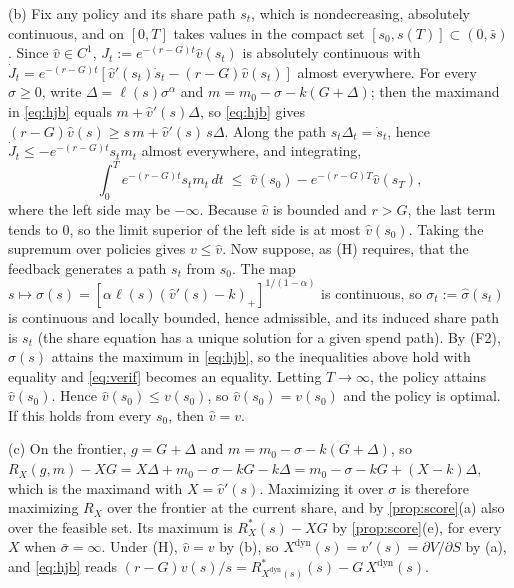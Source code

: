 (b) Fix any policy and its share path $s_t$, which is nondecreasing, absolutely continuous, and on $[0,T]$ takes values in the compact set $[s_0,s(T)]\subset(0,\bar s)$. Since $\hat v\in C^1$, $J_t:=e^{-(r-G)t}\hat v(s_t)$ is absolutely continuous with $\dot J_t=e^{-(r-G)t}[\hat v'(s_t)\dot s_t-(r-G)\hat v(s_t)]$ almost everywhere. For every $\sigma\ge 0$, write $\Delta=\ell(s)\sigma^{\alpha}$ and $m=m_0-\sigma-k(G+\Delta)$; then the maximand in \eqref{eq:hjb} equals $m+\hat v'(s)\Delta$, so \eqref{eq:hjb} gives $(r-G)\hat v(s)\ge s\,m+\hat v'(s)\,s\Delta$. Along the path $s_t\Delta_t=\dot s_t$, hence $\dot J_t\le-e^{-(r-G)t}s_tm_t$ almost everywhere, and integrating,
\begin{equation}\label{eq:verif}
\int_0^Te^{-(r-G)t}s_tm_t\,dt\;\le\;\hat v(s_0)-e^{-(r-G)T}\hat v(s_T),
\end{equation}
where the left side may be $-\infty$. Because $\hat v$ is bounded and $r>G$, the last term tends to $0$, so the limit superior of the left side is at most $\hat v(s_0)$. Taking the supremum over policies gives $v\le\hat v$. Now suppose, as (H) requires, that the feedback generates a path $s_t$ from $s_0$. The map $s\mapsto\hat\sigma(s)=[\alpha\ell(s)(\hat v'(s)-k)_+]^{1/(1-\alpha)}$ is continuous, so $\sigma_t:=\hat\sigma(s_t)$ is continuous and locally bounded, hence admissible, and its induced share path is $s_t$ (the share equation has a unique solution for a given spend path). By (F2), $\hat\sigma(s)$ attains the maximum in \eqref{eq:hjb}, so the inequalities above hold with equality and \eqref{eq:verif} becomes an equality. Letting $T\to\infty$, the policy attains $\hat v(s_0)$. Hence $\hat v(s_0)\le v(s_0)$, so $\hat v(s_0)=v(s_0)$ and the policy is optimal. If this holds from every $s_0$, then $\hat v=v$.

(c) On the frontier, $g=G+\Delta$ and $m=m_0-\sigma-k(G+\Delta)$, so $R_X(g,m)-XG=X\Delta+m_0-\sigma-kG-k\Delta=m_0-\sigma-kG+(X-k)\Delta$, which is the maximand with $X=\hat v'(s)$. Maximizing it over $\sigma$ is therefore maximizing $R_X$ over the frontier at the current share, and by \autoref{prop:score}(a) also over the feasible set. Its maximum is $R_X^*(s)-XG$ by \autoref{prop:score}(e), for every $X$ when $\bar\sigma=\infty$. Under (H), $\hat v=v$ by (b), so $X^{\mathrm{dyn}}(s)=v'(s)=\partial V/\partial S$ by (a), and \eqref{eq:hjb} reads $(r-G)v(s)/s=R^*_{X^{\mathrm{dyn}}(s)}(s)-G\,X^{\mathrm{dyn}}(s)$.

